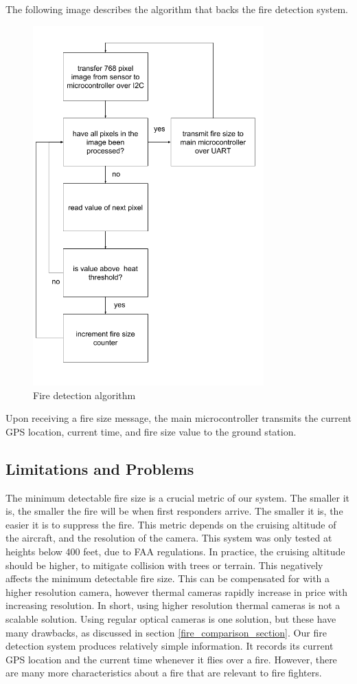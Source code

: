 \documentclass[12pt,journal,compsoc]{IEEEtran}
\begin{document}
The following image describes the algorithm that backs the fire detection system. 

\begin{figure}[h]
\centering
\includegraphics[width=3.5in]{fire_detection_algorithm.png}
\caption{Fire detection algorithm}
\end{figure} 

Upon receiving a fire size message, the main microcontroller transmits
the current GPS location, current time, and fire size value to the ground station.

\subsection{Limitations and Problems}
The minimum detectable fire size is a crucial metric of our system. The smaller it is, the smaller the fire will be when first responders arrive. The smaller it is, the easier it is to suppress the fire. This metric depends on the cruising altitude of the aircraft, and the resolution of the camera. This system was only tested at heights below 400 feet, due to FAA regulations. In practice, the cruising altitude should be higher, to mitigate collision with trees or terrain. This negatively affects the minimum detectable fire size. This can be compensated for with a higher resolution camera, however thermal cameras rapidly increase in price with increasing resolution. In short, using higher resolution thermal cameras is not a scalable solution. Using regular optical cameras is one solution, but these have many drawbacks, as discussed in section \ref{fire_comparison_section}.  
Our fire detection system produces relatively simple information. It records its current GPS location and the current time whenever it flies over a fire. However, there are many more characteristics about a fire that are relevant to fire fighters. 
\end{document}
